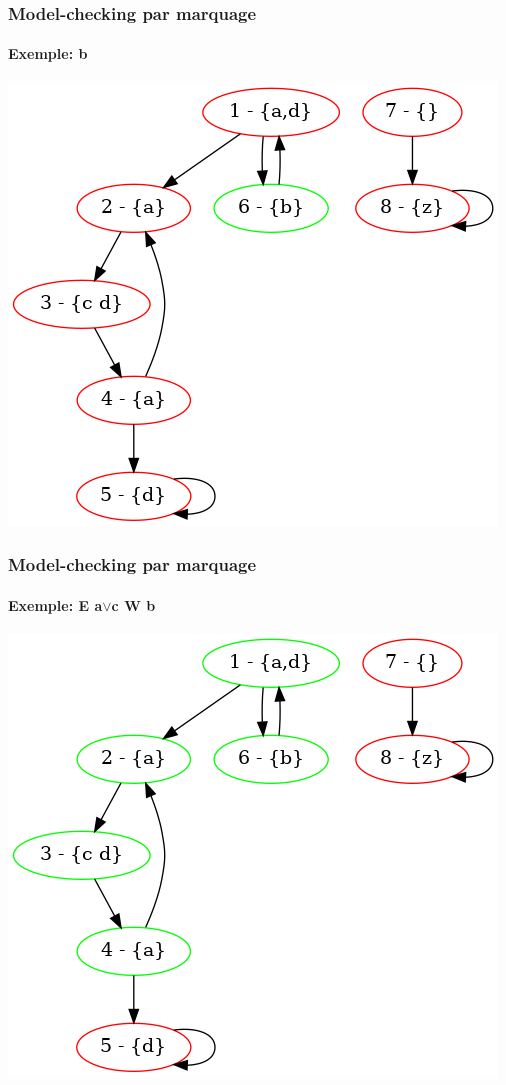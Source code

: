 \documentclass[11pt]{beamer}
\begin{document}
\begin{frame}
    \frametitle{Model-checking par marquage}
    \framesubtitle{Exemple: b}

    \includegraphics[scale=0.4]{imgs/marquage2.png}
\end{frame}

\begin{frame}
    \frametitle{Model-checking par marquage}
    \framesubtitle{Exemple: E a$\lor$c W b}

    \includegraphics[scale=0.4]{imgs/marquage3.png}
\end{frame}
\end{document}
